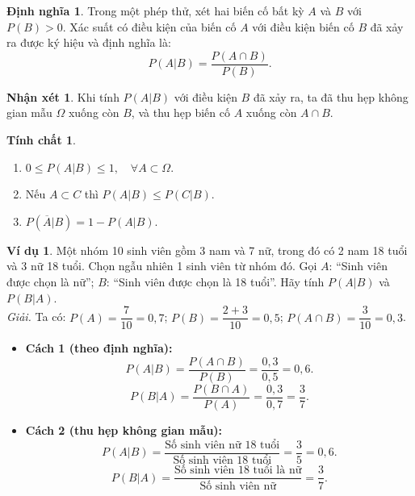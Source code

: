 \documentclass[12pt,a4paper]{article}
\theoremstyle{definition}
\newtheorem{dinhnghia}{Định nghĩa}[section]
\newtheorem{vidu}{Ví dụ}[section]
\newtheorem{nhanxet}{Nhận xét}[section]
\newtheorem{tinhchat}{Tính chất}[section]
\begin{document}
\begin{dinhnghia}
Trong một phép thử, xét hai biến cố bất kỳ $A$ và $B$ với $P(B) > 0$. Xác suất có điều kiện của biến cố $A$ với điều kiện biến cố $B$ đã xảy ra được ký hiệu và định nghĩa là:
\[
P(A|B) = \frac{P(A \cap B)}{P(B)}.
\]
\end{dinhnghia}

\begin{nhanxet}
Khi tính $P(A|B)$ với điều kiện $B$ đã xảy ra, ta đã thu hẹp không gian mẫu $\Omega$ xuống còn $B$, và thu hẹp biến cố $A$ xuống còn $A \cap B$.
\end{nhanxet}

\begin{tinhchat}
\begin{enumerate}[label=\arabic*)]
    \item $0 \le P(A|B) \le 1,\quad \forall A \subset \Omega$.
    \item Nếu $A \subset C$ thì $P(A|B) \le P(C|B)$.
    \item $P(\overline{A}|B) = 1 - P(A|B)$.
\end{enumerate}
\end{tinhchat}

\begin{vidu}
Một nhóm 10 sinh viên gồm 3 nam và 7 nữ, trong đó có 2 nam 18 tuổi và 3 nữ 18 tuổi. Chọn ngẫu nhiên 1 sinh viên từ nhóm đó.
Gọi $A$: ``Sinh viên được chọn là nữ''; $B$: ``Sinh viên được chọn là 18 tuổi''.
Hãy tính $P(A|B)$ và $P(B|A)$.\\
\textit{Giải.} 
Ta có: $P(A) = \dfrac{7}{10} = 0{,}7$; $P(B) = \dfrac{2 + 3}{10} = 0{,}5$; $P(A \cap B) = \dfrac{3}{10} = 0{,}3$.
\begin{itemize}
    \item \textbf{Cách 1 (theo định nghĩa):}
    \[
    P(A|B) = \frac{P(A \cap B)}{P(B)} = \frac{0{,}3}{0{,}5} = 0{,}6.
    \]
    \[
    P(B|A) = \frac{P(B \cap A)}{P(A)} = \frac{0{,}3}{0{,}7} = \frac{3}{7}.
    \]
    \item \textbf{Cách 2 (thu hẹp không gian mẫu):}
    \[
    P(A|B) = \frac{\text{Số sinh viên nữ 18 tuổi}}{\text{Số sinh viên 18 tuổi}} = \frac{3}{5} = 0{,}6.
    \]
    \[
    P(B|A) = \frac{\text{Số sinh viên 18 tuổi là nữ}}{\text{Số sinh viên nữ}} = \frac{3}{7}.
    \]
\end{itemize}
\end{vidu}
\end{document}
